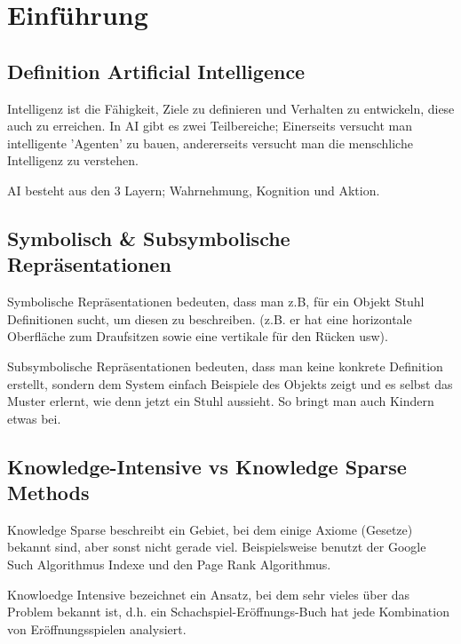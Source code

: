 \chapter{Einführung}
\section{Definition Artificial Intelligence}
Intelligenz ist die Fähigkeit, Ziele zu definieren und Verhalten zu entwickeln, diese auch zu erreichen. In AI gibt es zwei Teilbereiche; Einerseits versucht man intelligente 'Agenten' zu bauen, andererseits versucht man die menschliche Intelligenz zu verstehen.

AI besteht aus den 3 Layern; Wahrnehmung, Kognition und Aktion.
\section{Symbolisch \& Subsymbolische Repräsentationen}
Symbolische Repräsentationen bedeuten, dass man z.B, für ein Objekt Stuhl Definitionen sucht, um diesen zu beschreiben. (z.B. er hat eine horizontale Oberfläche zum Draufsitzen sowie eine vertikale für den Rücken usw).

Subsymbolische Repräsentationen bedeuten, dass man keine konkrete Definition erstellt, sondern dem System einfach Beispiele des Objekts zeigt und es selbst das Muster erlernt, wie denn jetzt ein Stuhl aussieht. So bringt man auch Kindern etwas bei.

\section{Knowledge-Intensive vs Knowledge Sparse Methods}
Knowledge Sparse beschreibt ein Gebiet, bei dem einige Axiome (Gesetze) bekannt sind, aber sonst nicht gerade viel. Beispielsweise benutzt der Google Such Algorithmus Indexe und den Page Rank Algorithmus.

Knowloedge Intensive bezeichnet ein Ansatz, bei dem sehr vieles über das Problem bekannt ist, d.h. ein Schachspiel-Eröffnungs-Buch hat jede Kombination von Eröffnungsspielen analysiert.